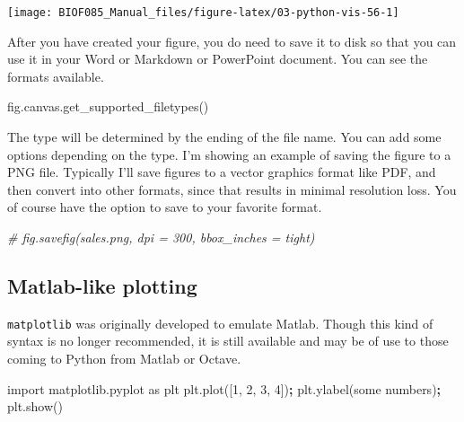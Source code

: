 \documentclass[
  letterpaper,
]{scrbook}
\newenvironment{Shaded}{\begin{snugshade}}{\end{snugshade}}
\newcommand{\CommentTok}[1]{\textcolor[rgb]{0.56,0.35,0.01}{\textit{#1}}}
\newcommand{\DecValTok}[1]{\textcolor[rgb]{0.00,0.00,0.81}{#1}}
\newcommand{\ImportTok}[1]{#1}
\newcommand{\NormalTok}[1]{#1}
\newcommand{\OperatorTok}[1]{\textcolor[rgb]{0.81,0.36,0.00}{\textbf{#1}}}
\newcommand{\StringTok}[1]{\textcolor[rgb]{0.31,0.60,0.02}{#1}}
\begin{document}
\begin{center}\texttt{[image: BIOF085\_Manual\_files/figure-latex/03-python-vis-56-1]} \end{center}

After you have created your figure, you do need to save it to disk so that you can use it in your Word or Markdown or PowerPoint document. You can see the formats available.

\begin{Shaded}
\begin{Highlighting}[]
\NormalTok{fig.canvas.get\_supported\_filetypes()}
\end{Highlighting}
\end{Shaded}

The type will be determined by the ending of the file name. You can add some options depending on the type. I'm showing an example of saving the figure to a PNG file. Typically I'll save figures to a vector graphics format like PDF, and then convert into other formats, since that results in minimal resolution loss. You of course have the option to save to your favorite format.

\begin{Shaded}
\begin{Highlighting}[]
\CommentTok{\# fig.savefig(\textquotesingle{}sales.png\textquotesingle{}, dpi = 300, bbox\_inches = \textquotesingle{}tight\textquotesingle{}) }
\end{Highlighting}
\end{Shaded}

\hypertarget{matlab-like-plotting}{%
\subsection{Matlab-like plotting}\label{matlab-like-plotting}}

\texttt{matplotlib} was originally developed to emulate Matlab. Though this kind of syntax is no longer recommended, it is still available and may be of use to those coming to Python from Matlab or Octave.

\begin{Shaded}
\begin{Highlighting}[]
\ImportTok{import}\NormalTok{ matplotlib.pyplot }\ImportTok{as}\NormalTok{ plt}
\NormalTok{plt.plot([}\DecValTok{1}\NormalTok{, }\DecValTok{2}\NormalTok{, }\DecValTok{3}\NormalTok{, }\DecValTok{4}\NormalTok{])}\OperatorTok{;}
\NormalTok{plt.ylabel(}\StringTok{\textquotesingle{}some numbers\textquotesingle{}}\NormalTok{)}\OperatorTok{;}
\NormalTok{plt.show()}
\end{Highlighting}
\end{Shaded}
\end{document}
